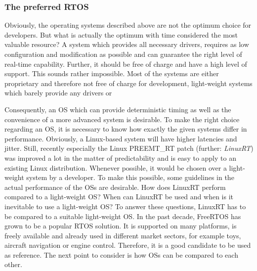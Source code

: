\subsubsection{The preferred RTOS}
Obviously, the operating systems described above are not the optimum choice for developers. 
But what is actually the optimum with time considered the most valuable resource?
A system which provides all necessary drivers, requires as low configuration and modification as possible and can guarantee the right level of real-time capability. 
Further, it should be free of charge and have a high level of support.
This sounds rather impossible. 
Most of the systems are either proprietary and therefore not free of charge for development, light-weight systems which barely provide any drivers or  


Consequently, an \ac{OS} which can provide deterministic timing as well as the convenience of a more advanced system is desirable.  
To make the right choice regarding an \ac{OS}, it is necessary to know how exactly the given systems differ in performance. 
Obviously, a Linux-based system will have higher latencies and jitter. 
Still, recently especially the Linux PREEMT\_RT patch (further: \textit{LinuxRT}) was improved a lot in the matter of predictability and is easy to apply to an existing Linux distribution. 
Whenever possible, it would be chosen over a light-weight system by a developer. 
To make this possible, some guidelines in the actual performance of the \acp{OS} are desirable. 
How does LinuxRT perform compared to a light-weight \ac{OS}?
When can LinuxRT be used and when is it inevitable to use a light-weight \ac{OS}?
To answer these questions, LinuxRT has to be compared to a suitable light-weight \ac{OS}. 
In the past decade, FreeRTOS has grown to be a popular \ac{RTOS} solution.
It is supported on many platforms, is freely available and already used in different market sectors, for example toys, aircraft navigation or engine control. 
Therefore, it is a good candidate to be used as reference.  
The next point to consider is how \acp{OS} can be compared to each other.
 
